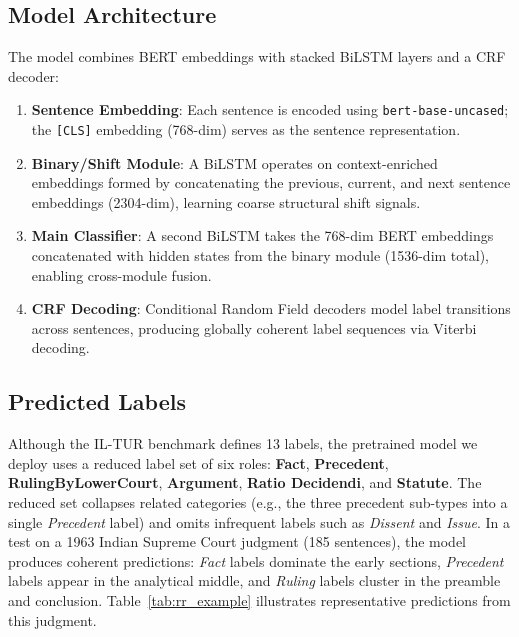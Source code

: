 \documentclass[11pt]{article}
\begin{document}
\subsection{Model Architecture}

The model combines BERT embeddings with stacked BiLSTM layers and a CRF decoder:

\begin{enumerate}
    \item \textbf{Sentence Embedding}: Each sentence is encoded using \texttt{bert-base-uncased}; the \texttt{[CLS]} embedding (768-dim) serves as the sentence representation.
    \item \textbf{Binary/Shift Module}: A BiLSTM operates on context-enriched embeddings formed by concatenating the previous, current, and next sentence embeddings (2304-dim), learning coarse structural shift signals.
    \item \textbf{Main Classifier}: A second BiLSTM takes the 768-dim BERT embeddings concatenated with hidden states from the binary module (1536-dim total), enabling cross-module fusion.
    \item \textbf{CRF Decoding}: Conditional Random Field decoders model label transitions across sentences, producing globally coherent label sequences via Viterbi decoding.
\end{enumerate}

\subsection{Predicted Labels}

Although the IL-TUR benchmark defines 13 labels, the pretrained model we deploy uses a reduced label set of six roles: \textbf{Fact}, \textbf{Precedent}, \textbf{RulingByLowerCourt}, \textbf{Argument}, \textbf{Ratio Decidendi}, and \textbf{Statute}.
The reduced set collapses related categories (e.g., the three precedent sub-types into a single \emph{Precedent} label) and omits infrequent labels such as \emph{Dissent} and \emph{Issue}.
In a test on a 1963 Indian Supreme Court judgment (185 sentences), the model produces coherent predictions: \emph{Fact} labels dominate the early sections, \emph{Precedent} labels appear in the analytical middle, and \emph{Ruling} labels cluster in the preamble and conclusion.
Table~\ref{tab:rr_example} illustrates representative predictions from this judgment.
\end{document}
